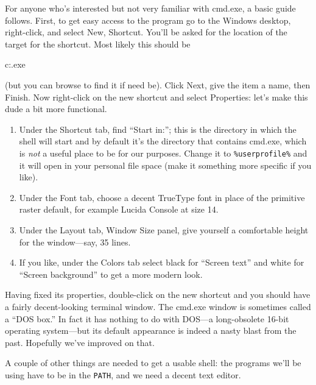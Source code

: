 \documentclass[oneside]{book}
\begin{document}
For anyone who's interested but not very familiar with
\textsf{cmd.exe}, a basic guide follows.  First, to get easy access to
the program go to the Windows desktop, right-click, and select New,
Shortcut. You'll be asked for the location of the target for the
shortcut. Most likely this should be
\begin{code}
c:\windows{}\cmd.exe
\end{code}
(but you can browse to find it if need be). Click \textsf{Next}, give
the item a name, then \textsf{Finish}. Now right-click on the new
shortcut and select \textsf{Properties}: let's make this dude a bit
more functional.
\begin{enumerate}
\item Under the Shortcut tab, find ``Start in:''; this is the
  directory in which the shell will start and by default it's the
  directory that contains \textsf{cmd.exe}, which is \textit{not} a
  useful place to be for our purposes. Change it to
  \verb|%userprofile%| and it will open in
  your personal file space (make it something more specific if you
  like).
\item Under the Font tab, choose a decent TrueType font in place of
  the primitive raster default, for example Lucida Console at size 14.
\item Under the Layout tab, Window Size panel, give yourself a
  comfortable height for the window---say, 35 lines.
\item If you like, under the Colors tab select black for ``Screen
  text'' and white for ``Screen background'' to get a more modern
  look.
\end{enumerate}

Having fixed its properties, double-click on the new shortcut and you
should have a fairly decent-looking terminal window. The
\textsf{cmd.exe} window is sometimes called a ``DOS box.''  In fact it
has nothing to do with \textsf{DOS}---a long-obsolete 16-bit operating
system---but its default appearance is indeed a nasty blast from the
past. Hopefully we've improved on that.

A couple of other things are needed to get a usable shell: the
programs we'll be using have to be in the \texttt{PATH}, and we need a
decent text editor.
\end{document}
